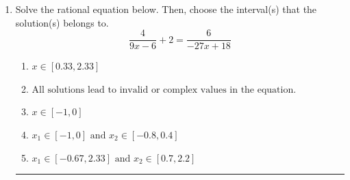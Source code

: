 \documentclass[14pt]{extbook}
\newcommand{\litem}[1]{\item#1\hspace*{-1cm}\rule{\textwidth}{0.4pt}}
\begin{document}
\begin{enumerate}
{\begin{enumerate}[label=\Alph*.]
\end{enumerate} }
\litem{
Solve the rational equation below. Then, choose the interval(s) that the solution(s) belongs to.\[ \frac{4}{9x -6} + 2 = \frac{6}{-27x + 18} \]\begin{enumerate}[label=\Alph*.]
\item \( x \in [0.33,2.33] \)
\item \( \text{All solutions lead to invalid or complex values in the equation.} \)
\item \( x \in [-1,0] \)
\item \( x_1 \in [-1, 0] \text{ and } x_2 \in [-0.8,0.4] \)
\item \( x_1 \in [-0.67, 2.33] \text{ and } x_2 \in [0.7,2.2] \)

\end{enumerate} }
\end{enumerate}
\end{document}
